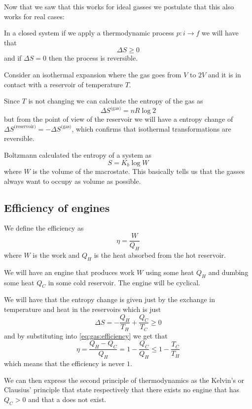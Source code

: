 \documentclass[14pt]{extarticle}
\begin{document}
Now that we saw that this works for ideal gasses we postulate that this also works for real cases:

\begin{theorem}
    \label{thm:gas:second_principle}
    In a closed system if we apply a thermodynamic process $p: i \to f$ we will have that
    \begin{equation}
        \Delta S \geq 0
    \end{equation}
    and if $\Delta S = 0$ then the process is reversible.
\end{theorem}

\begin{example}
    Consider an isothermal expansion where the gas goes from $V$ to $2V$ and it is in contact with a reservoir of temperature $T$.

    Since $T$ is not changing we can calculate the entropy of the gas as
    \begin{equation}
        \Delta S^{\text{(gas)}} = n R \log 2
    \end{equation}
    but from the point of view of the reservoir we will have a entropy change of $\Delta S^{\text{(reservoir)}} = - \Delta S^{\text{(gas)}}$, which confirms that isothermal transformations are reversible.
\end{example}

Boltzmann calculated the entropy of a system as
\begin{equation}
    S = K_b \log W
\end{equation}
where $W$ is the volume of the macrostate.
This basically tells us that the gasses always want to occupy as volume as possible.

\subsection{Efficiency of engines}

We define the efficiency as
\begin{equation}
    \label{eq:gas:efficiency}
    \eta = \frac{W}{Q_H}
\end{equation}
where $W$ is the work and $Q_H$ is the heat absorbed from the hot reservoir.

We will have an engine that produces work $W$ using some heat $Q_H$ and dumbing some heat $Q_C$ in some cold reservoir.
The engine will be cyclical.

We will have that the entropy change is given just by the exchange in temperature and heat in the reservoirs which is just
\begin{equation}
    \Delta S = - \frac{Q_H}{T_H} + \frac{Q_C}{T_C} \geq 0
\end{equation}
and by substituting into \autoref{eq:gas:efficiency} we get that
\begin{equation}
    \eta = \frac{Q_H - Q_C}{Q_H} = 1 - \frac{Q_C}{Q_H} \leq 1 - \frac{T_C}{T_H}
\end{equation}
which means that the efficiency is never $1$.

We can then express the second principle of thermodynamics as the Kelvin's or Clausius' principle that state respectively that there exists no engine that has $Q_C > 0$ and that a  does not exist.
\end{document}
